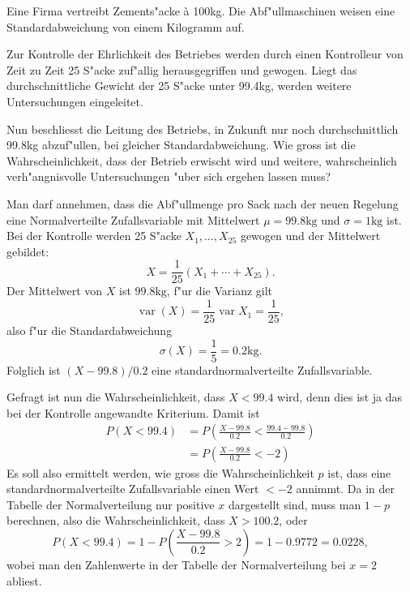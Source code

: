 Eine Firma vertreibt Zements"acke \`a 100kg. Die Abf"ullmaschinen weisen
eine Standardabweichung von einem Kilogramm auf.

Zur Kontrolle der Ehrlichkeit des Betriebes werden durch einen Kontrolleur
von Zeit zu Zeit 25 S"acke zuf"allig herausgegriffen und gewogen. Liegt
das durchschnittliche Gewicht der 25 S"acke unter 99.4kg, werden weitere
Untersuchungen eingeleitet.

Nun beschliesst die Leitung des Betriebs, in Zukunft nur noch durchschnittlich
99.8kg abzuf"ullen, bei gleicher Standardabweichung. Wie gross ist die
Wahrscheinlichkeit, dass der Betrieb erwischt wird und weitere, wahrscheinlich
verh"angnisvolle Untersuchungen "uber sich ergehen lassen muss?

\begin{loesung}
Man darf annehmen, dass die Abf"ullmenge pro Sack nach der neuen Regelung
eine Normalverteilte Zufallsvariable mit Mittelwert $\mu=99.8\text{kg}$ und
$\sigma=1\text{kg}$ ist. Bei der Kontrolle werden 25 S"acke $X_1,\dots,X_{25}$
gewogen und der Mittelwert gebildet:
\[
X=\frac1{25}(X_1+\cdots +X_{25}).
\]
Der Mittelwert von $X$ ist $99.8\text{kg}$, f"ur die Varianz gilt
\[
\operatorname{var}(X)=\frac1{25}\operatorname{var}{X_1}=\frac1{25},
\]
also f"ur die Standardabweichung
\[
\sigma(X)=\frac15=0.2\text{kg}.
\]
Folglich ist $(X-99.8)/0.2$ eine standardnormalverteilte Zufallsvariable.

Gefragt ist nun die Wahrscheinlichkeit, dass $X<99.4$ wird, denn dies ist ja
das bei der Kontrolle angewandte Kriterium. Damit ist
\begin{align*}
P(X<99.4)
&=P\left(\frac{X-99.8}{0.2} < \frac{99.4-99.8}{0.2}\right)\\
&=P\left(\frac{X-99.8}{0.2} < -2\right)
\end{align*}
Es soll also ermittelt werden, wie gross die Wahrscheinlichkeit $p$ ist, dass
eine standardnormalverteilte Zufallsvariable einen Wert $<-2$ annimmt.
Da in der Tabelle der Normalverteilung nur positive $x$ dargestellt sind,
muss man $1-p$ berechnen, also die Wahrscheinlichkeit, dass $X>100.2$,
oder
\[
P(X<99.4)=1-P\left(\frac{X-99.8}{0.2}>2\right)
=1-0.9772=0.0228,
\]
wobei man den Zahlenwerte in der Tabelle der Normalverteilung bei $x=2$ abliest.
\end{loesung}

